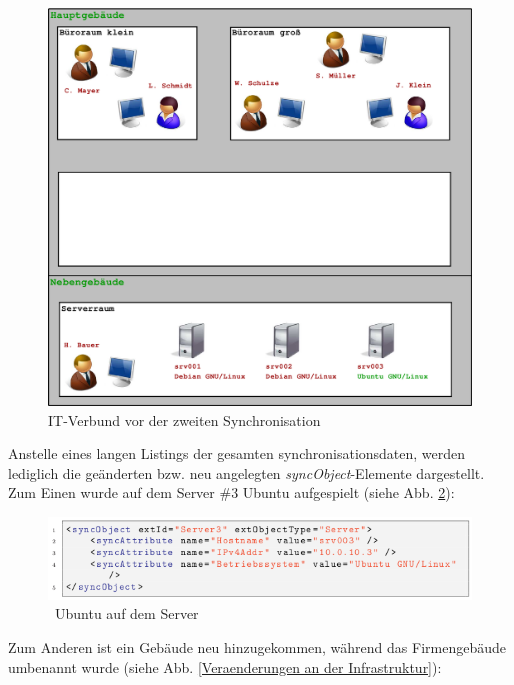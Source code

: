 \documentclass[a4paper,10pt]{book}
\begin{document}
\begin{figure}[htb!]
  \centering
  \includegraphics[scale=.28]{Screenshot/Mustermann_snapshot02_03.png}
  \caption{IT-Verbund vor der zweiten Synchronisation}
  \label{fig:it-verbund-vor-der-zweiten-synchronisation}
\end{figure}
\newline
Anstelle eines langen Listings der gesamten synchronisationsdaten, werden lediglich die geänderten
bzw. neu angelegten \textit{syncObject}-Elemente dargestellt.
\newline\\
Zum Einen wurde auf dem Server \#3 Ubuntu aufgespielt (siehe Abb. \ref{Ubuntu auf dem Server}):
\newline
\begin{figure}[htb!]
  \centering
  \includegraphics[scale=.75]{Screenshot/SyncAPI_Fallstudie_10.png}
  \caption{\label{Ubuntu auf dem Server} \ Ubuntu auf dem Server}
\end{figure}
\newline
Zum Anderen ist ein Gebäude neu hinzugekommen, während das Firmengebäude umbenannt wurde (siehe Abb. \ref{Veraenderungen an der Infrastruktur}):
\end{document}
